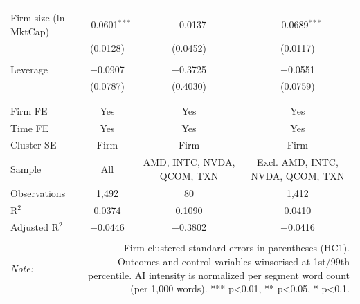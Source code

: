 \begin{table}[!htbp]
\begin{tabular}{@{\extracolsep{5pt}}lccc}
  & & & \\ 
 Firm size (ln MktCap) & $-$0.0601$^{***}$ & $-$0.0137 & $-$0.0689$^{***}$ \\ 
  & (0.0128) & (0.0452) & (0.0117) \\ 
  & & & \\ 
 Leverage & $-$0.0907 & $-$0.3725 & $-$0.0551 \\ 
  & (0.0787) & (0.4030) & (0.0759) \\ 
  & & & \\ 
\hline \\[-1.8ex] 
Firm FE & Yes & Yes & Yes \\ 
Time FE & Yes & Yes & Yes \\ 
Cluster SE & Firm & Firm & Firm \\ 
Sample & All & AMD, INTC, NVDA, QCOM, TXN & Excl. AMD, INTC, NVDA, QCOM, TXN \\ 
Observations & 1,492 & 80 & 1,412 \\ 
R$^{2}$ & 0.0374 & 0.1090 & 0.0410 \\ 
Adjusted R$^{2}$ & $-$0.0446 & $-$0.3802 & $-$0.0416 \\ 
\hline 
\hline \\[-1.8ex] 
\textit{Note:}  & \multicolumn{3}{r}{Firm-clustered standard errors in parentheses (HC1). Outcomes and control variables winsorised at 1st/99th percentile. AI intensity is normalized per segment word count (per 1,000 words). *** p<0.01, ** p<0.05, * p<0.1.} \\ 
\end{tabular} 
\end{table} 

